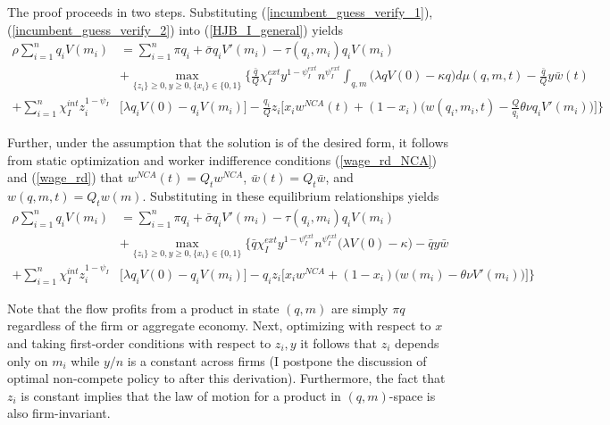 \documentclass[12pt,english]{article}
\theoremstyle{remark}
\begin{document}
The proof proceeds in two steps. Substituting (\ref{incumbent_guess_verify_1}),(\ref{incumbent_guess_verify_2}) into (\ref{HJB_I_general}) yields
\small
\begin{align}
\rho \sum_{i=1}^n q_i V(m_i) &= \sum_{i=1}^n \pi q_i + \bar{\sigma} q_i V'(m_i)  - \tau(q_i,m_i) q_i V(m_i) \nonumber \\ 
& + \max_{\{z_i\} \ge 0, y \ge 0, \{x_i\}\in \{0,1\}} \Bigg\{ \frac{\bar{q}}{Q}\chi_I^{ext} y^{1-\psi_I^{ext}} n^{\psi_I^{ext}} \int_{q,m} \Big(\lambda q V(0) - \kappa q \Big) d\mu(q,m,t) - \frac{\bar{q}}{Q} y \bar{w}(t) \nonumber \\
+ \sum_{i=1}^n \chi_I^{int} z_{i}^{1-\psi_I} &\Bigg[ \lambda q_i V(0) - q_i V(m_i) \Bigg] - \frac{q_i}{Q} z_{i} \Bigg[ x_i w^{NCA}(t) + (1-x_i) \Big( w(q_i,m_i,t) - \frac{Q}{q_i}\theta \nu q_i V'(m_i) \Big) \Bigg]\Bigg\} \label{HJB_I_guessAndVerify_1}
\end{align}
\normalsize 

Further, under the assumption that the solution is of the desired form, it follows from static optimization and worker indifference conditions (\ref{wage_rd_NCA}) and (\ref{wage_rd}) that $w^{NCA}(t) = Q_t w^{NCA}$, $\bar{w}(t) = Q_t \bar{w}$, and $w(q,m,t) = Q_t w(m)$. Substituting in these equilibrium relationships yields
\small
\begin{align}
\rho \sum_{i=1}^n q_i V(m_i) &= \sum_{i=1}^n \pi q_i + \bar{\sigma} q_i V'(m_i)  - \tau(q_i,m_i) q_i V(m_i) \nonumber \\ 
& + \max_{\{z_i\} \ge 0, y \ge 0, \{x_i\} \in \{0,1\}} \Bigg\{ \bar{q} \chi_I^{ext} y^{1-\psi_I^{ext}} n^{\psi_I^{ext}} \Big( \lambda V(0) - \kappa \Big) - \bar{q} y \bar{w} \nonumber \\
+ \sum_{i=1}^n \chi_I^{int} z_{i}^{1-\psi_I} &\Bigg[ \lambda q_i V(0) - q_i V(m_i) \Bigg] - q_i z_{i} \Bigg[ x_i w^{NCA} + (1-x_i) \Big( w(m_i) - \theta \nu V'(m_i)\Big) \Bigg] \Bigg\} \label{HJB_I_guessAndVerify_2}
\end{align}
\normalsize 

Note that the flow profits from a product in state $(q,m)$ are simply $\pi q$ regardless of the firm or aggregate economy. Next, optimizing with respect to $x$ and taking first-order conditions with respect to $z_i,y$ it follows that $z_i$ depends only on $m_i$ while $y / n$ is a constant across firms (I postpone the discussion of optimal non-compete policy to after this derivation). Furthermore, the fact that $z_i$ is constant implies that the law of motion for a product in $(q,m)$-space is also firm-invariant.
\end{document}
